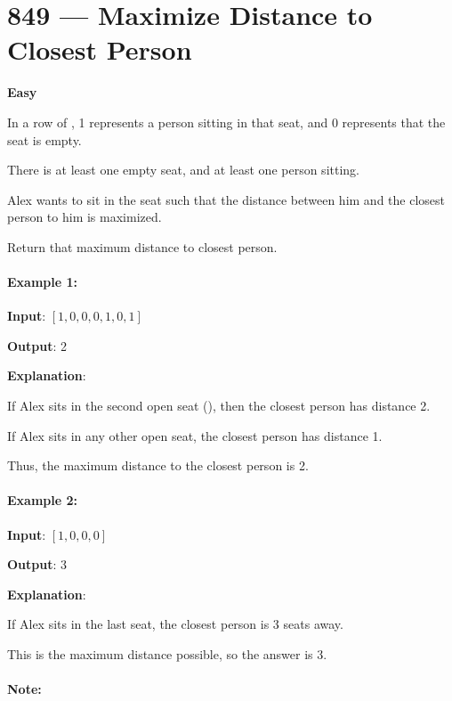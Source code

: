 \section{849 --- Maximize Distance to Closest Person}

\textbf{Easy}

In a row of , 1 represents a person sitting in that seat, and 0 represents that the seat is empty. 

There is at least one empty seat, and at least one person sitting.

Alex wants to sit in the seat such that the distance between him and the closest person to him is maximized. 

Return that maximum distance to closest person.

\paragraph{Example 1:}

\begin{flushleft}
\textbf{Input}: $ [1,0,0,0,1,0,1] $

\textbf{Output}: 2

\textbf{Explanation}: 

If Alex sits in the second open seat (), then the closest person has distance 2.

If Alex sits in any other open seat, the closest person has distance 1.

Thus, the maximum distance to the closest person is 2.
\end{flushleft}

\paragraph{Example 2:}

\begin{flushleft}
\textbf{Input}: $ [1,0,0,0] $

\textbf{Output}: 3

\textbf{Explanation}:
 
If Alex sits in the last seat, the closest person is 3 seats away.

This is the maximum distance possible, so the answer is 3.
\end{flushleft}

\paragraph{Note:}

